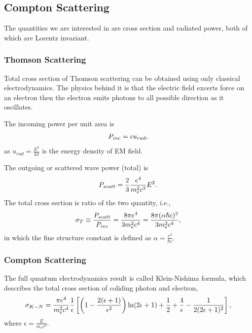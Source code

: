 \documentclass[letterpaper,10pt,english]{sphinxmanual}
\begin{document}
\subsection{Compton Scattering}
\label{astrophysics:compton-scattering}
The quantities we are interested in are cross section and radiated power, both of which are Lorentz invariant.


\subsubsection{Thomson Scattering}
\label{astrophysics:thomson-scattering}
Total cross section of Thomson scattering can be obtained using only classical electrodynamics. The physics behind it is that the electric field excerts force on an electron then the electron emits photons to all possible direction as it oscillates.

The incoming power per unit area is
\begin{gather}
\begin{split}P_{inc}= c u_{rad},\end{split}\notag
\end{gather}
as \(u_{rad} = \frac{E^2}{4\pi}\) is the energy density of EM field.

The outgoing or scattered wave power (total) is
\begin{gather}
\begin{split}P_{scatt} = \frac{2}{3}\frac{e^4}{m_e^2 c^3} E^2.\end{split}\notag
\end{gather}
The total cross section is ratio of the two quantity, i.e.,
\begin{gather}
\begin{split}\sigma_T \equiv \frac{P_{scatt}}{P_{inc}} =\frac{8\pi e^4}{3 m_e ^2 c^4} = \frac{8\pi (\alpha \hbar c)^2}{3 m_e ^2 c^4},\end{split}\notag
\end{gather}
in which the fine structure constant is defined as \(\alpha = \frac{e^2}{\hbar c}\).


\subsubsection{Compton Scattering}
\label{astrophysics:id1}
The full quantum electrodynamics result is called Klein-Nishima formula, which describes the total cross section of coliding photon and electron,
\begin{gather}
\begin{split}\sigma_{K-N} = \frac{\pi e^4}{m_e^2 c^4} \frac{1}{\epsilon} \left[ \left(1 - \frac{2(\epsilon+1)}{\epsilon^2}\right) \ln (2\epsilon + 1) + \frac{1}{2} + \frac{4}{\epsilon} - \frac{1}{2(2\epsilon + 1)^2} \right],\end{split}\notag
\end{gather}
where \(\epsilon = \frac{E}{m_e c^2}\).
\end{document}
